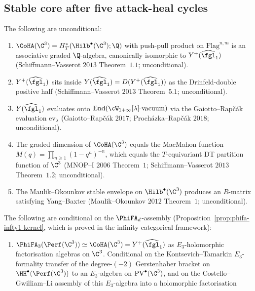 \subsection*{Stable core after five attack-heal cycles}

\begin{proposition}
\label{prop:stable-core-wave10}
\ClaimStatusProvedHere
The following are unconditional:
\begin{enumerate}[label=\textup{(\roman*)}]
 \item $\CoHA(\C^3) = H^*_T(\Hilb^\bullet(\C^3); \Q)$ with push-pull
  product on $\mathrm{Flag}^{n, m}$ is an associative graded $\Q$-algebra,
  canonically isomorphic to $Y^+(\widehat{\fgl}_1)$ (Schiffmann--Vasserot
  $2013$ Theorem~$1.1$; unconditional).
 \item $Y^+(\widehat{\fgl}_1)$ sits inside $Y(\widehat{\fgl}_1) =
  D(Y^+(\widehat{\fgl}_1))$ as the Drinfeld-double positive half
  (Schiffmann--Vasserot $2013$ Theorem~$5.1$; unconditional).
 \item $Y(\widehat{\fgl}_1)$ evaluates onto $\mathrm{End}(\cW_{1+\infty}[\lambda]
  \text{-vacuum})$ via the Gaiotto--Rap\v{c}\'ak evaluation
  $\mathrm{ev}_\lambda$ (Gaiotto--Rap\v{c}\'ak $2017$; Proch\'azka--Rap\v{c}\'ak
  $2018$; unconditional).
 \item The graded dimension of $\CoHA(\C^3)$ equals the MacMahon function
  $M(q) = \prod_{n \geq 1}(1 - q^n)^{-n}$, which equals the
  $T$-equivariant DT partition function of $\C^3$ (MNOP--$\mathrm{I}$
  $2006$ Theorem~$1$; Schiffmann--Vasserot $2013$ Theorem~$1.2$;
  unconditional).
 \item The Maulik--Okounkov stable envelope on $\Hilb^\bullet(\C^3)$
  produces an $R$-matrix satisfying Yang--Baxter (Maulik--Okounkov $2012$
  Theorem~$1$; unconditional).
\end{enumerate}
The following are conditional on the $\PhiFA_d$-assembly
(Proposition~\ref{prop:phifa-infty1-kernel}, which is proved in the
infinity-categorical framework):
\begin{enumerate}[label=\textup{(\alph*)}]
 \item $\PhiFA_3(\Perf(\C^3)) \simeq \CoHA(\C^3) = Y^+(\widehat{\fgl}_1)$
  as $E_3$-holomorphic factorisation algebras on $\C^3$. Conditional on
  the Kontsevich--Tamarkin $E_3$-formality transfer of the degree-$(-2)$
  Gerstenhaber bracket on $\HH^\bullet(\Perf(\C^3))$ to an $E_3$-algebra
  on $\mathrm{PV}^\bullet(\C^3)$, and on the Costello--Gwilliam--Li
  assembly of this $E_3$-algebra into a holomorphic factorisation

\end{enumerate}
\end{proposition}
